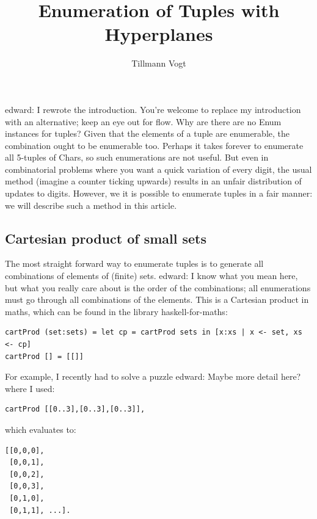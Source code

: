 \documentclass{tmr}
\title{Enumeration of Tuples with Hyperplanes} %
\author{Tillmann Vogt\email{tillk.vogt@googlemail.com}}
\newcommand{\authornote}[3]{{\color{#2} {\sc #1}: #3}}
\newcommand\bay[1]{\authornote{edward}{blue}{#1}}
\begin{document}
\begin{introduction}
\bay{I rewrote the introduction. You're welcome to replace my introduction with an alternative; keep an eye out for flow.}
Why are there are no Enum instances for tuples?  Given that the elements of a tuple are enumerable, the combination ought to be enumerable too.  Perhaps it takes forever to enumerate all 5-tuples of Chars, so such enumerations are not useful. But even in combinatorial problems where you want a quick variation of every digit, the usual method (imagine a counter ticking upwards) results in an unfair distribution of updates to digits.  However, we it is possible to enumerate tuples in a fair manner: we will describe such a method in this article.
\end{introduction}

\subsection{Cartesian product of small sets}

The most straight forward way to enumerate tuples is to generate all combinations of elements of (finite) sets. \bay{I know what you mean here, but what you really care about is the order of the combinations; all enumerations must go through all combinations of the elements.} This is a Cartesian product in maths, which can be found in the library haskell-for-maths:
\begin{Verbatim}
cartProd (set:sets) = let cp = cartProd sets in [x:xs | x <- set, xs <- cp]
cartProd [] = [[]]
\end{Verbatim}

For example, I recently had to solve a puzzle \bay{Maybe more detail here?} where I used:

\begin{Verbatim}
cartProd [[0..3],[0..3],[0..3]],
\end{Verbatim}
which evaluates to:
\begin{Verbatim}
[[0,0,0],
 [0,0,1],
 [0,0,2],
 [0,0,3],
 [0,1,0],
 [0,1,1], ...].
\end{Verbatim}
\end{document}
